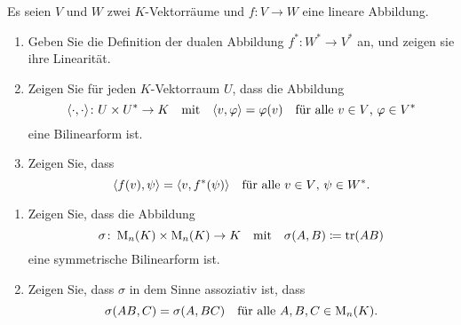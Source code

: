 \documentclass[a4paper,10pt]{scrartcl}
\begin{document}
\begin{question}
  Es seien $V$ und $W$ zwei $K$-Vektorräume und $f \colon V \to W$ eine lineare Abbildung.
  \begin{enumerate}[leftmargin=*]
    \item
      Geben Sie die Definition der dualen Abbildung $f^* \colon W^* \to V^*$ an, und zeigen sie ihre Linearität.
    \item
      Zeigen Sie für jeden $K$-Vektorraum $U$, dass die Abbildung
      \[
        \langle \cdot, \cdot \rangle \colon U \times U^* \to K
        \quad\text{mit}\quad
        \langle v, \varphi \rangle = \varphi(v)
        \quad\text{für alle $v \in V$, $\varphi \in V^*$}
      \]
      eine Bilinearform ist.
    \item
      Zeigen Sie, dass
      \[
        \langle f(v), \psi \rangle = \langle v, f^*(\psi) \rangle
        \quad
        \text{für alle $v \in V$, $\psi \in W^*$}.
      \]
  \end{enumerate}
\end{question}


\begin{question}
  \begin{enumerate}[leftmargin=*]
    \item
      Zeigen Sie, dass die Abbildung
      \[
        \sigma \colon \operatorname{M}_n(K) \times \operatorname{M}_n(K) \to K
        \quad\text{mit}\quad
        \sigma(A, B) \coloneqq \operatorname{tr}(AB)
      \]
      eine symmetrische Bilinearform ist.
    \item
      Zeigen Sie, dass $\sigma$ in dem Sinne assoziativ ist, dass
      \[
        \sigma(AB, C) = \sigma(A, BC)
        \quad
        \text{für alle $A, B, C \in \operatorname{M}_n(K)$}.
      \]
  \end{enumerate}
\end{question}
\end{document}

